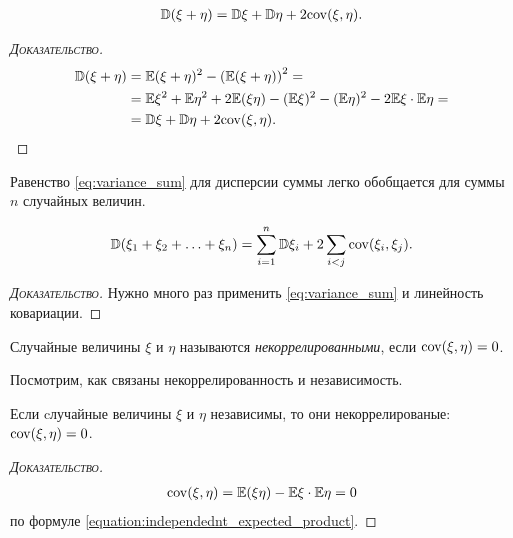 \documentclass[../main.tex]{subfiles}
\begin{document}
      \begin{prop}
       \begin{align}
        \label{eq:variance_sum}
        \mathbb D(\xi + \eta) = \mathbb D\xi + \mathbb D\eta + 2\mathrm{cov}(\xi,\eta).
       \end{align}
      \end{prop}
      \begin{proof}[\normalfont\textsc{Доказательство}]
       \begin{align*}
        \mathbb D(\xi+\eta) &= \mathbb E(\xi+\eta)^{2} - \left( \mathbb E(\xi+\eta) \right)^{2} = \\
        &= \mathbb E\xi^{2} + \mathbb E\eta^{2} + 2\mathbb E(\xi\eta) - (\mathbb E\xi)^{2} - (\mathbb E\eta)^{2} - 2\mathbb E\xi \cdot \mathbb E\eta = \\
        &= \mathbb D\xi + \mathbb D\eta +2\mathrm{cov}(\xi,\eta).
       \end{align*} 
      \end{proof}

      Равенство \eqref{eq:variance_sum} для дисперсии суммы легко обобщается для суммы $ n $ случайных величин.

      \begin{prop}
       \begin{align}
        \label{eq:variance_sum_many}
        \mathbb D(\xi_1 + \xi_2 + \ldots + \xi_n) = \sum_{i=1}^{n} \mathbb D\xi_i + 2 \sum_{i < j} \mathrm{cov}(\xi_i, \xi_j).
       \end{align} 
      \end{prop}
      \begin{proof}[\normalfont\textsc{Доказательство}]
       Нужно много раз применить \eqref{eq:variance_sum} и линейность ковариации.
      \end{proof}

      \begin{df}
       Случайные величины $ \xi $ и $ \eta $ называются \textit{некоррелированными}, если $ \mathrm{cov}(\xi,\eta)=0 $.
      \end{df}

      Посмотрим, как связаны некоррелированность и независимость.

      \begin{prop}
       Если cлучайные величины $ \xi $ и $ \eta $ независимы, то они некоррелированые: $\mathrm{cov}(\xi,\eta) = 0$. 
      \end{prop}
      \begin{proof}[\normalfont\textsc{Доказательство}]
       \begin{align*}
        \mathrm{cov}(\xi,\eta) = \mathbb E(\xi\eta) - \mathbb E\xi \cdot \mathbb E\eta = 0
       \end{align*} по формуле \eqref{equation:independednt_expected_product}.
      \end{proof}
\end{document}
